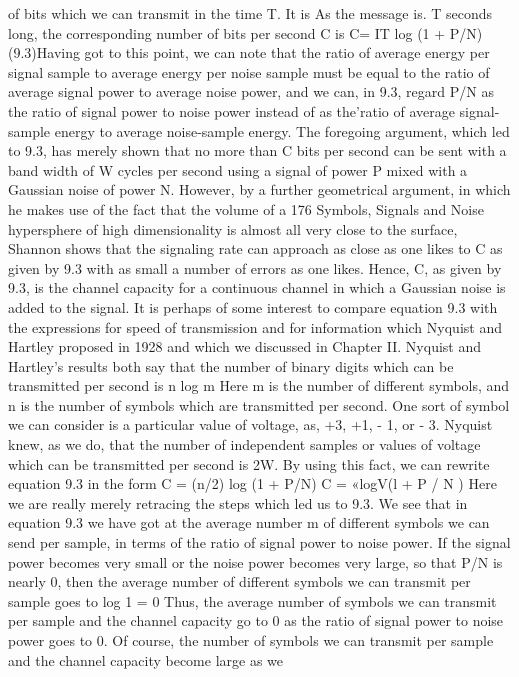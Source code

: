 {{{{{{{{{{{of bits which we can transmit in the time T. It is
As the message is. T seconds long, the corresponding number of bits
per second C is
C= IT log (1 + P/N) (9.3)Having got to this point, we can note that the ratio of average
energy per signal sample to average energy per noise sample must
be equal to the ratio of average signal power to average noise
power, and we can, in 9.3, regard P/N as the ratio of signal power
to noise power instead of as the’ratio of average signal-sample
energy to average noise-sample energy.
The foregoing argument, which led to 9.3, has merely shown that
no more than C bits per second can be sent with a band width of
W cycles per second using a signal of power P mixed with a
Gaussian noise of power N. However, by a further geometrical
argument, in which he makes use of the fact that the volume of a
176
Symbols, Signals and Noise
hypersphere of high dimensionality is almost all very close to the
surface, Shannon shows that the signaling rate can approach as
close as one likes to C as given by 9.3 with as small a number of
errors as one likes. Hence, C, as given by 9.3, is the channel
capacity for a continuous channel in which a Gaussian noise is
added to the signal.
It is perhaps of some interest to compare equation 9.3 with the
expressions for speed of transmission and for information which
Nyquist and Hartley proposed in 1928 and which we discussed in
Chapter II. Nyquist and Hartley’s results both say that the number
of binary digits which can be transmitted per second is
n log m
Here m is the number of different symbols, and n is the number
of symbols which are transmitted per second.
One sort of symbol we can consider is a particular value of
voltage, as, +3, +1, - 1, or - 3. Nyquist knew, as we do, that the
number of independent samples or values of voltage which can be
transmitted per second is 2W. By using this fact, we can rewrite
equation 9.3 in the form
C = (n/2) log (1 + P/N)
C = «logV(l + P / N )
Here we are really merely retracing the steps which led us to 9.3.
We see that in equation 9.3 we have got at the average number
m of different symbols we can send per sample, in terms of the ratio
of signal power to noise power. If the signal power becomes very
small or the noise power becomes very large, so that P/N is
nearly 0, then the average number of different symbols we can
transmit per sample goes to
log 1 = 0
Thus, the average number of symbols we can transmit per sample
and the channel capacity go to 0 as the ratio of signal power to
noise power goes to 0. Of course, the number of symbols we can
transmit per sample and the channel capacity become large as we
}}}}}}}}}}}
